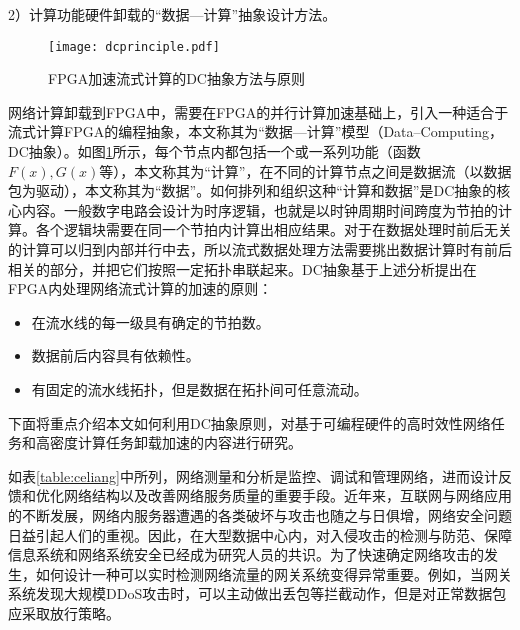 2）计算功能硬件卸载的“数据---计算”抽象设计方法。

\begin{figure}[!ht]
	\centering 
	\vspace{-1.5mm}
	\texttt{[image: dcprinciple.pdf]}
	\caption{FPGA加速流式计算的DC抽象方法与原则} \label{fig:dcprinciple}
\end{figure}

网络计算卸载到FPGA中，需要在FPGA的并行计算加速基础上，引入一种适合于流式计算FPGA的编程抽象，本文称其为“数据---计算”模型（Data--Computing，DC抽象）。如图\ref{fig:dcprinciple}所示，每个节点内都包括一个或一系列功能（函数$F(x), G(x)$等），本文称其为“计算”，在不同的计算节点之间是数据流（以数据包为驱动），本文称其为“数据”。如何排列和组织这种“计算和数据”是DC抽象的核心内容。一般数字电路会设计为时序逻辑，也就是以时钟周期时间跨度为节拍的计算。各个逻辑块需要在同一个节拍内计算出相应结果。对于在数据处理时前后无关的计算可以归到内部并行中去，所以流式数据处理方法需要挑出数据计算时有前后相关的部分，并把它们按照一定拓扑串联起来。DC抽象基于上述分析提出在FPGA内处理网络流式计算的加速的原则：

\begin{itemize}
	\item 在流水线的每一级具有确定的节拍数。
	\item 数据前后内容具有依赖性。%
	\item 有固定的流水线拓扑，但是数据在拓扑间可任意流动。
\end{itemize}

下面将重点介绍本文如何利用DC抽象原则，对基于可编程硬件的高时效性网络任务和高密度计算任务卸载加速的内容进行研究。







 \label{chap34}

\label{chap341}

如表\ref{table:celiang}中所列，网络测量和分析是监控、调试和管理网络，进而设计反馈和优化网络结构以及改善网络服务质量的重要手段。近年来，互联网与网络应用的不断发展，网络内服务器遭遇的各类破坏与攻击也随之与日俱增，网络安全问题日益引起人们的重视。因此，在大型数据中心内，对入侵攻击的检测与防范、保障信息系统和网络系统安全已经成为研究人员的共识。为了快速确定网络攻击的发生，如何设计一种可以实时检测网络流量的网关系统变得异常重要。例如，当网关系统发现大规模DDoS攻击时，可以主动做出丢包等拦截动作，但是对正常数据包应采取放行策略。

